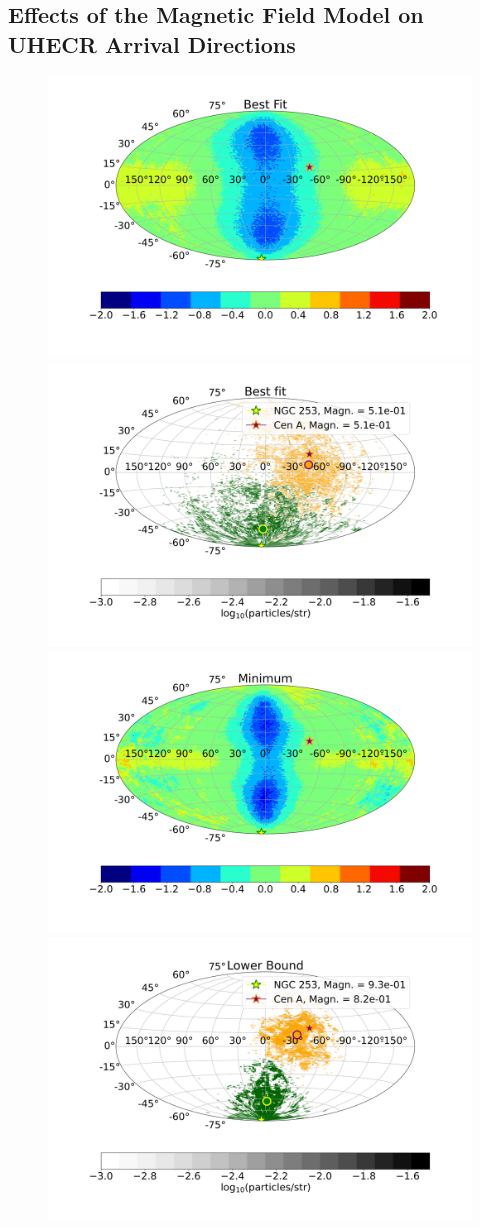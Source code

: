\documentclass[usenatbib]{mnras}
\begin{document}
\subsection{Effects of the Magnetic Field Model on UHECR Arrival Directions}
\begin{figure}
\centering
\includegraphics[width=0.49\linewidth]{Images/AD/Obs_20_Rgc_14kpc_Bstr_3.96_Btur_6.72_R_5_Z_6_New_Grid_Imposed_Log_Bins_180_Historgam_LB_N2_Str_Tur_TM_40_EeV.png}
\includegraphics[width=0.49\linewidth]{Images/AD/Rgc_14kpc_BF_Bins_180Bs_3.96_Btur_6.72_N2_CenA_NGC253_Str_Tur_TM_40_EeV.png}\\
\includegraphics[width=0.49\linewidth]{Images/AD/Bstr_2.0_Btur_3.15_R_5_Z_6_New_Grid_Imposed_Log_Bins_180_Historgam_LB_N2_Str_Tur_TM_40_EeV.png}
\includegraphics[width=0.49\linewidth]{Images/AD/LB_Bins_180Bs_2.0_Btur_3.15_N2_CenA_NGC253_Str_Tur_TM_40_EeV.png}\\

\end{figure}
\end{document}
